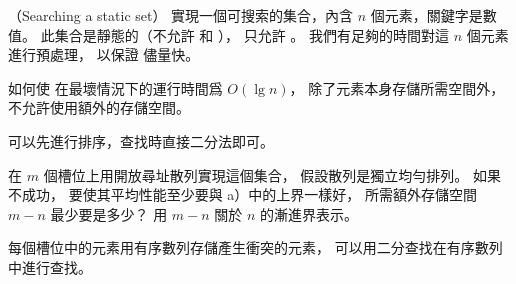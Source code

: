 \startPROBLEM
（Searching a static set）
實現一個可搜索的集合，內含 $n$ 個元素，關鍵字是數值。
此集合是靜態的（不允許  和 ），
只允許 。
我們有足夠的時間對這 $n$ 個元素進行預處理，
以保證  儘量快。

\startigBase[a]\startitem
如何使  在最壞情況下的運行時間爲 $O(\lg n)$，
除了元素本身存儲所需空間外，不允許使用額外的存儲空間。
\stopitem\stopigBase

\startANSWER
可以先進行排序，查找時直接二分法即可。
\stopANSWER

\startigBase[continue]\startitem
在 $m$ 個槽位上用開放尋址散列實現這個集合，
假設散列是獨立均勻排列。
如果  不成功，
要使其平均性能至少要與 a）中的上界一樣好，
所需額外存儲空間 $m-n$ 最少要是多少？
用 $m-n$ 關於 $n$ 的漸進界表示。
\stopitem\stopigBase

\startANSWER
每個槽位中的元素用有序數列存儲產生衝突的元素，
可以用二分查找在有序數列中進行查找。
\stopANSWER

\stopPROBLEM
